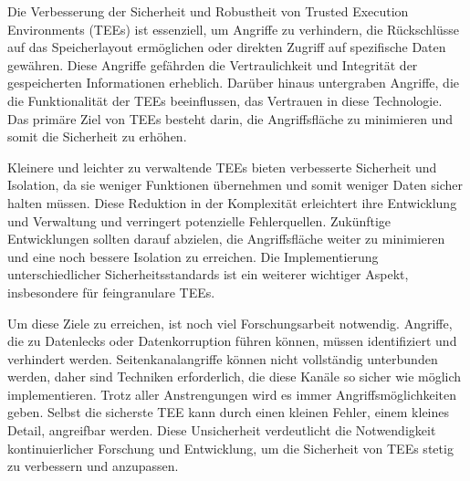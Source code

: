 
Die Verbesserung der Sicherheit und Robustheit von Trusted Execution Environments (TEEs) ist essenziell, um Angriffe zu verhindern, die Rückschlüsse auf das Speicherlayout ermöglichen oder direkten Zugriff auf spezifische Daten gewähren. Diese Angriffe gefährden die Vertraulichkeit und Integrität der gespeicherten Informationen erheblich. Darüber hinaus untergraben Angriffe, die die Funktionalität der TEEs beeinflussen, das Vertrauen in diese Technologie. Das primäre Ziel von TEEs besteht darin, die Angriffsfläche zu minimieren und somit die Sicherheit zu erhöhen.

Kleinere und leichter zu verwaltende TEEs bieten verbesserte Sicherheit und Isolation, da sie weniger Funktionen übernehmen und somit weniger Daten sicher halten müssen. Diese Reduktion in der Komplexität erleichtert ihre Entwicklung und Verwaltung und verringert potenzielle Fehlerquellen. Zukünftige Entwicklungen sollten darauf abzielen, die Angriffsfläche weiter zu minimieren und eine noch bessere Isolation zu erreichen. Die Implementierung unterschiedlicher Sicherheitsstandards ist ein weiterer wichtiger Aspekt, insbesondere für feingranulare TEEs.

Um diese Ziele zu erreichen, ist noch viel Forschungsarbeit notwendig. 
Angriffe, die zu Datenlecks oder Datenkorruption führen können, müssen identifiziert und verhindert werden. Seitenkanalangriffe können nicht vollständig unterbunden werden, daher sind Techniken erforderlich, die diese Kanäle so sicher wie möglich implementieren. 
Trotz aller Anstrengungen wird es immer Angriffsmöglichkeiten geben. Selbst die sicherste TEE kann durch einen kleinen Fehler, einem kleines Detail, angreifbar werden. Diese Unsicherheit verdeutlicht die Notwendigkeit kontinuierlicher Forschung und Entwicklung, um die Sicherheit von TEEs stetig zu verbessern und anzupassen.